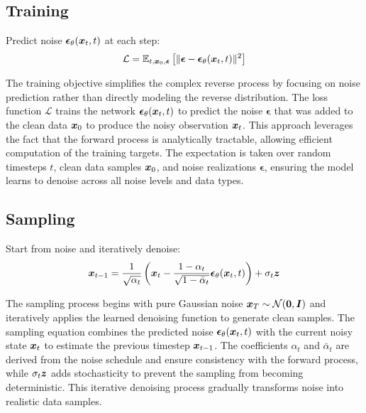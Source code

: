 \subsection{Training}

Predict noise $\boldsymbol{\epsilon}_{\theta}(\boldsymbol{x}_t, t)$ at each step:
\begin{equation}
\mathcal{L} = \mathbb{E}_{t, \boldsymbol{x}_0, \boldsymbol{\epsilon}}\left[\|\boldsymbol{\epsilon} - \boldsymbol{\epsilon}_{\theta}(\boldsymbol{x}_t, t)\|^2\right]
\end{equation}

The training objective simplifies the complex reverse process by focusing on noise prediction rather than directly modeling the reverse distribution. The loss function $\mathcal{L}$ trains the network $\boldsymbol{\epsilon}_{\theta}(\boldsymbol{x}_t, t)$ to predict the noise $\boldsymbol{\epsilon}$ that was added to the clean data $\boldsymbol{x}_0$ to produce the noisy observation $\boldsymbol{x}_t$. This approach leverages the fact that the forward process is analytically tractable, allowing efficient computation of the training targets. The expectation is taken over random timesteps $t$, clean data samples $\boldsymbol{x}_0$, and noise realizations $\boldsymbol{\epsilon}$, ensuring the model learns to denoise across all noise levels and data types.

\subsection{Sampling}

Start from noise and iteratively denoise:
\begin{equation}
\boldsymbol{x}_{t-1} = \frac{1}{\sqrt{\alpha_t}}\left(\boldsymbol{x}_t - \frac{1-\alpha_t}{\sqrt{1-\bar{\alpha}_t}}\boldsymbol{\epsilon}_{\theta}(\boldsymbol{x}_t, t)\right) + \sigma_t \boldsymbol{z}
\end{equation}

The sampling process begins with pure Gaussian noise $\boldsymbol{x}_T \sim \mathcal{N}(\boldsymbol{0}, \boldsymbol{I})$ and iteratively applies the learned denoising function to generate clean samples. The sampling equation combines the predicted noise $\boldsymbol{\epsilon}_{\theta}(\boldsymbol{x}_t, t)$ with the current noisy state $\boldsymbol{x}_t$ to estimate the previous timestep $\boldsymbol{x}_{t-1}$. The coefficients $\alpha_t$ and $\bar{\alpha}_t$ are derived from the noise schedule and ensure consistency with the forward process, while $\sigma_t \boldsymbol{z}$ adds stochasticity to prevent the sampling from becoming deterministic. This iterative denoising process gradually transforms noise into realistic data samples.

